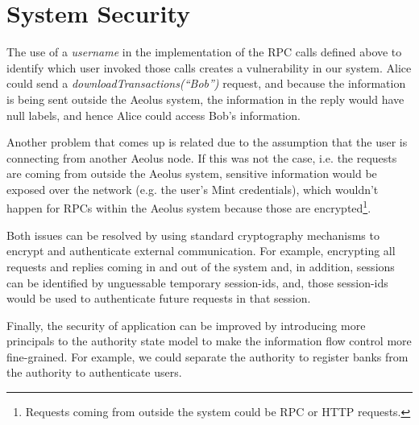 \section{System Security}

The use of a \emph{username} in the implementation of the RPC calls defined above to identify which user invoked those calls creates a vulnerability in our system. Alice could send a \emph{downloadTransactions(``Bob'')} request, and because the information is being sent outside the Aeolus system, the information in the reply would have null labels, and hence Alice could access Bob's information.

Another problem that comes up is related due to the assumption that the user is connecting from another Aeolus node. If this was not the case, i.e. the requests are coming from outside the Aeolus system, sensitive information would be exposed over the network (e.g. the user's Mint credentials), which wouldn't happen for RPCs within the Aeolus system because those are encrypted\footnote{Requests coming from outside the system could be RPC or HTTP requests.}.

Both issues can be resolved by using standard cryptography mechanisms to encrypt and authenticate external communication. For example, encrypting all requests and replies coming in and out of the system and, in addition, sessions can be identified by unguessable temporary session-ids, and, those session-ids would be used to authenticate future requests in that session.

Finally, the security of application can be improved by introducing more principals to the authority state model to make the information flow control more fine-grained. For example, we could separate the authority to register banks from the authority to authenticate users.
